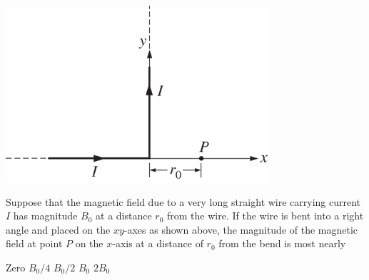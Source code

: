 \begin{center}
\includegraphics[scale=0.5]{images/img-006-016.png}
\end{center}

\begin{questions}\setcounter{question}{17}\question
Suppose that the magnetic field due to a very long straight wire carrying current $I$ has magnitude $B_{0}$ at a distance $r_{0}$ from the wire. If the wire is bent into a right angle and placed on the $x y$-axes as shown above, the magnitude of the magnetic field at point $P$ on the $x$-axis at a distance of $r_{0}$ from the bend is most nearly

\begin{oneparchoices}
\choice Zero
\choice $B_{0} / 4$
\choice $B_{0} / 2$
\choice $B_{0}$
\choice $2 B_{0}$
\end{oneparchoices}\end{questions}

